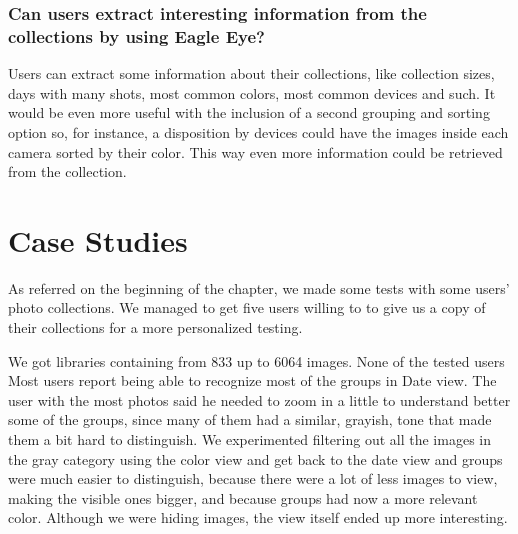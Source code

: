 \subsubsection{Can users extract interesting information from the collections by using Eagle Eye?}

Users can extract some information about their collections, like collection sizes, days with many shots, most common colors, most common devices and such. It would be even more useful with the inclusion of a second grouping and sorting option so, for instance, a disposition by devices could have the images inside each camera sorted by their color. This way even more information could be retrieved from the collection.


\section{Case Studies}

As referred on the beginning of the chapter, we made some tests with some users' photo collections. We managed to get five users willing to to give us a copy of their collections for a more personalized testing.

We got libraries containing from 833 up to 6064 images. None of the tested users  Most users report being able to recognize most of the  groups in Date view. The user with the most photos said he needed to zoom in a little to understand better some of the groups, since many of them had a similar, grayish, tone that made them a bit hard to distinguish. We experimented filtering out all the images in the gray category using the color view and get back to the date view and groups were much easier to distinguish, because there were a lot of less images to view, making the visible ones bigger, and because groups had now a more relevant color. Although we were hiding images, the view itself ended up more interesting.

